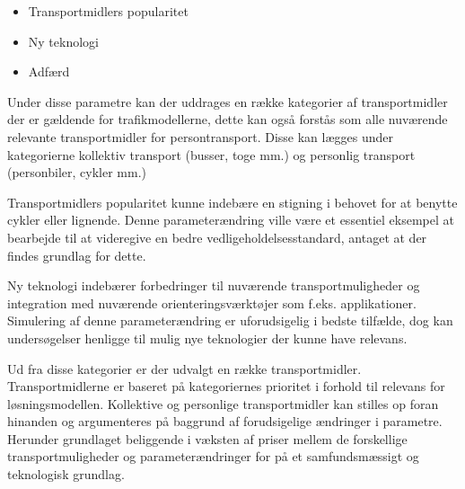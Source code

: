 \begin{itemize}
\item Transportmidlers popularitet
\item Ny teknologi
\item Adfærd
\end{itemize}

Under disse parametre kan der uddrages en række kategorier af transportmidler der er gældende for trafikmodellerne, dette kan også forstås som alle nuværende relevante transportmidler for persontransport. Disse kan lægges under kategorierne kollektiv transport (busser, toge mm.) og personlig transport (personbiler, cykler mm.)

\vspace{5mm}

Transportmidlers popularitet kunne indebære en stigning i behovet for at benytte cykler eller lignende. Denne parameterændring ville være et essentiel eksempel at bearbejde til at videregive en bedre vedligeholdelsesstandard, antaget at der findes grundlag for dette.

\vspace{5mm}

Ny teknologi indebærer forbedringer til nuværende transportmuligheder og integration med nuværende orienteringsværktøjer som f.eks. applikationer. Simulering af denne parameterændring er uforudsigelig i bedste tilfælde, dog kan undersøgelser henligge til mulig nye teknologier der kunne have relevans.

\vspace{5mm}



Ud fra disse kategorier er der udvalgt en række transportmidler. Transportmidlerne er baseret på kategoriernes prioritet i forhold til relevans for løsningsmodellen. Kollektive og personlige transportmidler kan stilles op foran hinanden og argumenteres på baggrund af forudsigelige ændringer i parametre. Herunder grundlaget beliggende i væksten af priser mellem de forskellige transportmuligheder og parameterændringer for på et samfundsmæssigt og teknologisk grundlag.